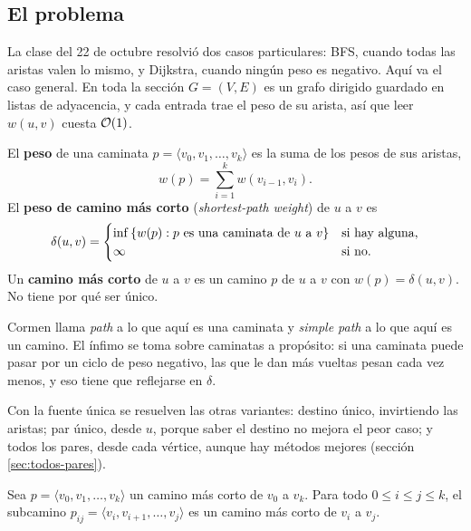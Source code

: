 \documentclass[11pt,letterpaper]{article}
\begin{document}
\subsection*{El problema}

La clase del 22 de octubre resolvió dos casos particulares: BFS,
cuando todas las aristas valen lo mismo, y Dijkstra, cuando ningún
peso es negativo. Aquí va el caso general. En toda la sección
$G = (V, E)$ es un grafo dirigido guardado en listas de adyacencia, y
cada entrada trae el peso de su arista, así que leer $w(u, v)$ cuesta
$\mathcal{O}\!\left(1\right)$.

\begin{definicion}
  \label{def:distancia-fuente}
  El \textbf{peso} de una caminata
  $p = \langle v_0, v_1, \dots, v_k \rangle$ es la suma de los pesos
  de sus aristas,
  \[
    w(p) = \sum_{i=1}^{k} w(v_{i-1}, v_i) .
  \]
  El \textbf{peso de camino más corto} (\textit{shortest-path
  weight}) de $u$ a $v$ es
  \[
    \delta(u, v) =
    \begin{cases}
      \inf \left\{ w(p) : p \text{ es una caminata de } u
        \text{ a } v \right\} & \text{si hay alguna,} \\
      \infty & \text{si no.}
    \end{cases}
  \]
  Un \textbf{camino más corto} de $u$ a $v$ es un camino $p$ de $u$ a
  $v$ con $w(p) = \delta(u, v)$. No tiene por qué ser único.
\end{definicion}

\begin{observacion}
  Cormen llama \textit{path} a lo que aquí es una caminata y
  \textit{simple path} a lo que aquí es un camino. El ínfimo se toma
  sobre caminatas a propósito: si una caminata puede pasar por un
  ciclo de peso negativo, las que le dan más vueltas pesan cada vez
  menos, y eso tiene que reflejarse en $\delta$.
\end{observacion}

Con la fuente única se resuelven las otras variantes: destino único,
invirtiendo las aristas; par único, desde $u$, porque saber el
destino no mejora el peor caso; y todos los pares, desde cada vértice,
aunque hay métodos mejores (sección \ref{sec:todos-pares}).

\begin{lema}\label{lem:subcaminos-cortos}
  Sea $p = \langle v_0, v_1, \dots, v_k\rangle$ un camino más corto
  de $v_0$ a $v_k$. Para todo $0 \le i \le j \le k$, el subcamino
  $p_{ij} = \langle v_i, v_{i+1}, \dots, v_j\rangle$ es un camino más
  corto de $v_i$ a $v_j$.
\end{lema}
\end{document}
